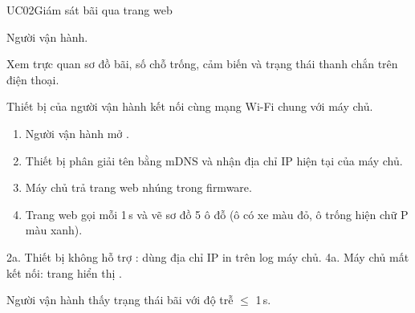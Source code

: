\begin{usecase}{UC02}{Giám sát bãi qua trang web}
\item[Tác nhân] Người vận hành.
\item[Mô tả] Xem trực quan sơ đồ bãi, số chỗ trống, cảm biến và trạng thái thanh chắn trên điện thoại.
\item[Tiền điều kiện] Thiết bị của người vận hành kết nối cùng mạng Wi-Fi chung với máy chủ.
\item[Luồng chính] \begin{enumerate}[nosep,leftmargin=1.3em]
  \item Người vận hành mở .
  \item Thiết bị phân giải tên bằng mDNS và nhận địa chỉ IP hiện tại của máy chủ.
  \item Máy chủ trả trang web nhúng trong firmware.
  \item Trang web gọi  mỗi 1\,s và vẽ sơ đồ 5 ô đỗ (ô có xe màu đỏ, ô trống hiện chữ P màu xanh).
\end{enumerate}
\item[Ngoại lệ] 2a. Thiết bị không hỗ trợ : dùng địa chỉ IP in trên log máy chủ.
  4a. Máy chủ mất kết nối: trang hiển thị .
\item[Hậu điều kiện] Người vận hành thấy trạng thái bãi với độ trễ $\le$ 1\,s.
\end{usecase}

